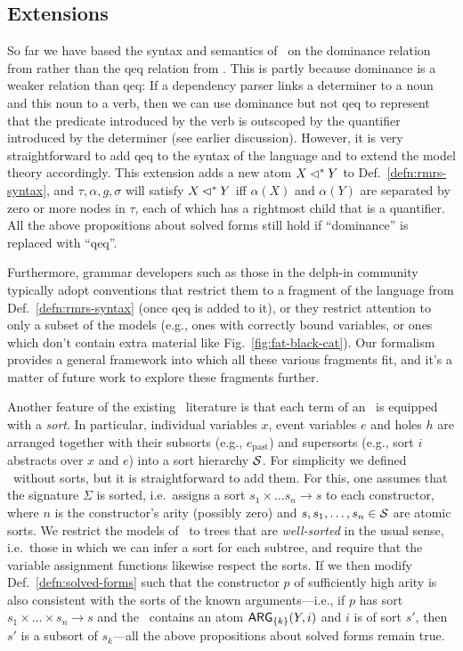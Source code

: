 \subsection{Extensions}
\label{sec:extensions}

So far we have based the syntax and semantics of \rmrs\ on the
dominance relation from  rather than the qeq
relation from .  This is partly because
dominance is a weaker relation than qeq: If a dependency parser links
a determiner to a noun and this noun to a verb, then we can use
dominance but not qeq to represent that the predicate introduced by
the verb is outscoped by the quantifier introduced by the determiner
(see earlier discussion).  However, it is very straightforward to add
qeq to the syntax of the language and to extend the model theory
accordingly.  This extension adds a new atom $X \lhd^* Y$ to
Def.~\ref{defn:rmrs-syntax}, and $\tau,\alpha,g,\sigma$ will satisfy
$X \lhd^* Y$ iff $\alpha(X)$ and $\alpha(Y)$ are separated by zero or more
nodes in $\tau$, each of which has a rightmost child that is a
quantifier. All the above propositions about solved forms still hold
if ``dominance'' is replaced with ``qeq''.

Furthermore, grammar developers such as those in the {\sc delph-in}
community typically adopt conventions that restrict them to a fragment
of the language from Def.~\ref{defn:rmrs-syntax} (once qeq is added to
it), or they restrict attention to only a subset of the models (e.g.,
ones with correctly bound variables, or ones which don't contain extra
material like Fig.~\ref{fig:fat-black-cat}).  Our formalism provides a
general framework into which all these various fragments fit, and it's
a matter of future work to explore these fragments further.

Another feature of the existing \rmrs\ literature is that each term of
an \rmrs\ is equipped with a \emph{sort}.  In particular, individual
variables $x$, event variables $e$ and holes $h$ are arranged together
with their subsorts (e.g., $e_{\mbox{past}}$) and supersorts (e.g.,
sort $i$ abstracts over $x$ and $e$) into a
sort hierarchy ${\cal S}$. 
For simplicity we defined \rmrs\ without sorts, but it is
straightforward to add them.  For this, one
assumes that the signature $\Sigma$ is sorted, i.e.\ assigns a sort
$s_1\times\ldots s_n\rightarrow s$ to each constructor, where $n$ is
the constructor's arity (possibly zero) and $s,s_1,\ldots,s_n\in {\cal
  S}$ are atomic sorts.  We restrict the models of \rmrs\ to trees
that are \emph{well-sorted} in the usual sense, i.e.\ those in which
we can infer a sort for each subtree, and require that the variable
assignment functions likewise respect the sorts.  If we then modify
Def.~\ref{defn:solved-forms} such that the constructor $p$ of
sufficiently high arity is also consistent with the sorts of the known
arguments---i.e., if $p$ has sort $s_1 \times \ldots \times s_n
\rightarrow s$ and the \rmrs\ contains an atom $\mathsf{ARG}_{\{k\}}(Y,i)$ and
$i$ is of sort $s'$, then $s'$ is a subsort of $s_k$---all the above
propositions about solved forms remain true.



